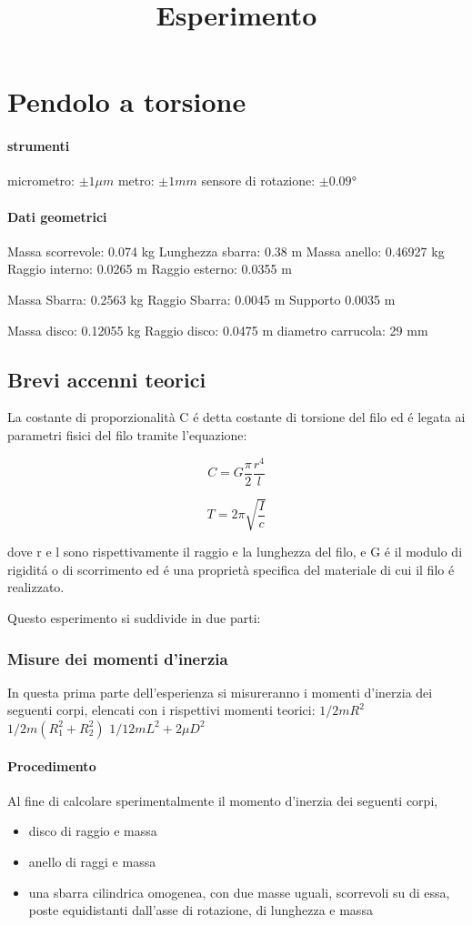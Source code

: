 \documentclass[a4paper,10pt]{report}
\title{Esperimento}
\begin{document}
\maketitle

\chapter{Pendolo a torsione}

\subsubsection{ strumenti}
micrometro: $ \pm 1 \mu m$
metro: $\pm 1 mm$
sensore di rotazione: $\pm 0.09 °$

\subsubsection{Dati geometrici}
Massa scorrevole: 0.074 kg
Lunghezza sbarra: 0.38 m
Massa anello: 0.46927 kg
Raggio interno: 0.0265 m
Raggio esterno: 0.0355 m

Massa Sbarra: 0.2563 kg
Raggio Sbarra: 0.0045 m
Supporto 0.0035 m

Massa disco: 0.12055 kg
Raggio disco: 0.0475 m
diametro carrucola: 29 mm

\section{ Brevi accenni teorici}
La costante di proporzionalità C \'e detta costante di torsione del filo ed \'e legata ai parametri fisici del filo tramite l'equazione:


 $$ C = G \frac{\pi}{2}\frac{r^4}{l} $$

$$ T = 2\pi \sqrt{\frac{I}{c}}$$


dove r e l sono rispettivamente il raggio e la lunghezza del filo, e G \'e il modulo di rigidit\'a o di scorrimento ed \'e una proprietà specifica del materiale di cui il filo \'e realizzato.

Questo esperimento si suddivide in due parti:
\subsection{Misure dei momenti d'inerzia}
In questa prima parte dell'esperienza si misureranno i momenti d'inerzia dei seguenti corpi, elencati con i rispettivi momenti teorici:
$ 1/2 m R^2 $
$ 1/2 m (R^2_1 + R^2_2) $
$ 1/12 m L^2 + 2 \mu D^2  $
\subsubsection*{Procedimento}
Al fine di calcolare sperimentalmente il momento d'inerzia dei seguenti corpi,
\begin{itemize}
\item disco di raggio e massa
\item anello di raggi e massa
\item una sbarra cilindrica omogenea, con due masse uguali, scorrevoli su di essa, poste equidistanti dall’asse di rotazione, di lunghezza e massa
\end{itemize}
\end{document}
